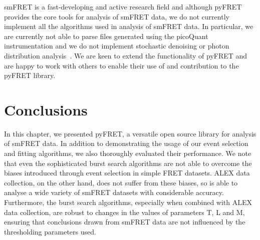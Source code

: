 smFRET is a fast-developing and active research field and although pyFRET provides the core tools for analysis of smFRET data, we do not currently implement all the algorithms used in analysis of smFRET data. In particular, we are currently not able to parse files generated using the picoQuant instrumentation and we do not implement stochastic denoising or photon distribution analysis~\cite{kalinin2007, antonik2006, santoso10, torella11}. We are keen to extend the functionality of pyFRET and are happy to work with others to enable their use of and contribution to the pyFRET library.

\section{Conclusions}
In this chapter, we presented pyFRET, a versatile open source library for analysis of smFRET data. In addition to demonstrating the usage of our event selection and fitting algorithms, we also thoroughly evaluated their performance. We note that even the sophisticated burst search algorithms are not able to overcome the biases introduced through event selection in simple FRET datasets. ALEX data collection, on the other hand, does not suffer from these biases, so is able to analyse a wide variety of smFRET datasets with considerable accuracy. Furthermore, the burst search algorithms, especially when combined with ALEX data collection, are robust to changes in the values of parameters T, L and M, ensuring that conclusions drawn from smFRET data are not influenced by the thresholding parameters used.









